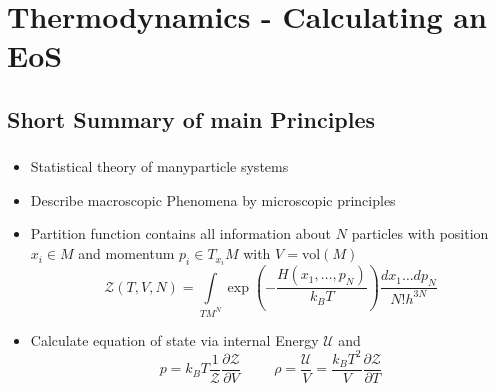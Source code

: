 \section{Thermodynamics - Calculating an EoS}

\subsection{Short Summary of main Principles}
\begin{frame}
	\frametitle{\insertsubsection}
	\begin{itemize}[<+->]
		\item Statistical theory of manyparticle systems
		\item Describe macroscopic Phenomena by microscopic principles
		\item Partition function contains all information about $N$ particles with position $x_i\in M$ and momentum $p_i\in T_{x_i}M$ with $V=\text{vol}(M)$
		\begin{equation}
			\mathcal{Z}(T,V,N) = \int\limits_{TM^N}\exp\left(-\frac{H(x_1,\dots,p_N)}{k_BT}\right)\frac{dx_1\dots dp_N}{N!h^{3N}}
		\end{equation}
		\item Calculate equation of state via internal Energy $\mathcal{U}$ and
		\begin{equation}
			p = k_BT\frac{1}{\mathcal{Z}}\frac{\partial\mathcal{Z}}{\partial V} \hspace{1cm} \rho = \frac{\mathcal{U}}{V} = \frac{k_BT^2}{V}\frac{\partial\mathcal{Z}}{\partial T}
			\label{1-Thermo-Pres-Dens}
		\end{equation}
	\end{itemize}
\end{frame}

